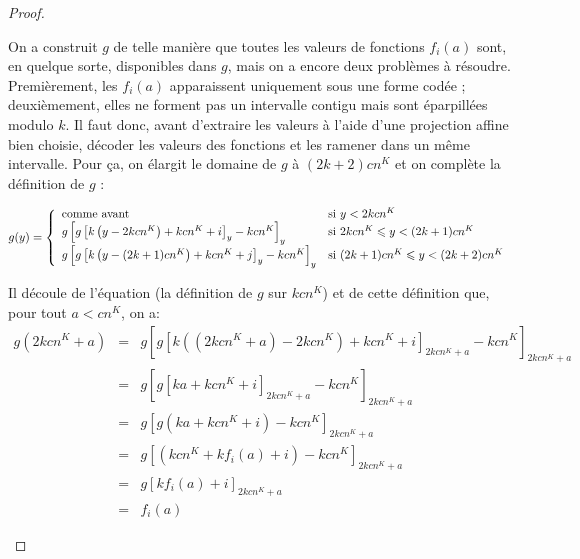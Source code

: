 \begin{proof}
\begin{enumerate}[itemsep=-1mm,leftmargin=2cm]
					On a construit $g$ de telle manière que toutes les valeurs de fonctions $f_i(a)$ sont, en quelque sorte, disponibles dans $g$, mais on a encore deux problèmes à résoudre. Premièrement, les $f_i(a)$ apparaissent uniquement sous une forme codée ; deuxièmement, elles ne forment pas un intervalle contigu mais sont éparpillées modulo $k$. Il faut donc, avant d'extraire les valeurs à l'aide d'une projection affine bien choisie, décoder les valeurs des fonctions et les ramener dans un même intervalle. Pour ça, on élargit le domaine de $g$ à $(2k+2)cn^K$ et on complète la définition de $g$ :
					
					\[
						g(y) = \left\lbrace \begin{array}{ll} 
							\text{comme avant} & \text{si $y < 2kcn^K$} \\
							g\left[ g\left[ k\left( y - 2kcn^K \right) + kcn^K  + i\right]_y - kcn^K  \right]_y & \text{si $2kcn^K \leqslant y < (2k+1)cn^K$} \\
							g\left[ g\left[ k\left( y - (2k + 1)cn^K \right) + kcn^K  + j \right]_y - kcn^K  \right]_y & \text{si $(2k+1)cn^K \leqslant y < (2k+2)cn^K$} \\
							 \end{array} \right.
					\]
					
					Il découle de l'équation \redtext{$(\star)$} (la définition de $g$ sur $kcn^K$) et de cette définition que, pour tout $a < cn^K$, on a\footnotemark :
					\setcounter{equation}{0}
					\begin{eqnarray}
						g\left( 2kcn^K + a\right)	& = & 		g\left[ g\left[ k\left( \left(2kcn^K + a\right) - 2kcn^K \right) + kcn^K  + i\right]_{2kcn^K + a} - kcn^K  \right]_{2kcn^K + a} \\
													& = & 		g\left[ g\left[ k a + kcn^K  + i\right]_{2kcn^K + a} - kcn^K  \right]_{2kcn^K + a} \\
													& = & 		g\left[ g\left( k a + kcn^K  + i\right) - kcn^K  \right]_{2kcn^K + a} \\
													& = & 		g\left[ \left(kcn^K  +  k f_i(a) + i\right) - kcn^K  \right]_{2kcn^K + a} \\
													& = & 		g\left[ k f_i(a) + i \right]_{2kcn^K + a} \\
													& = & 		f_i(a)
					\end{eqnarray}
					

\end{enumerate}
\end{proof}

